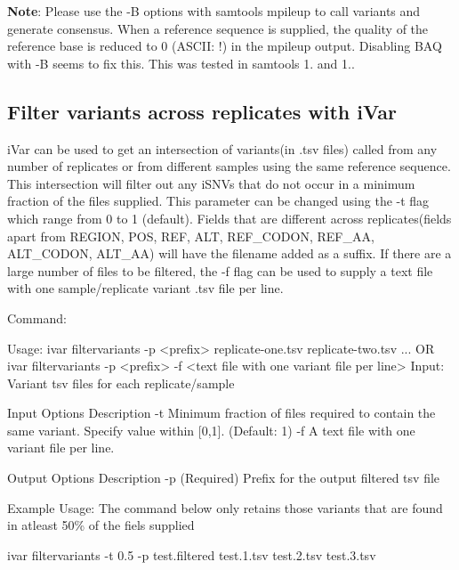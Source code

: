 {\bfseries Note}\+: Please use the -\/B options with {\ttfamily samtools mpileup} to call variants and generate consensus. When a reference sequence is supplied, the quality of the reference base is reduced to 0 (A\+S\+C\+II\+: !) in the mpileup output. Disabling B\+AQ with -\/B seems to fix this. This was tested in samtools 1. and 1..\hypertarget{manualpage_autotoc_md18}{}\subsection{Filter variants across replicates with i\+Var}\label{manualpage_autotoc_md18}
i\+Var can be used to get an intersection of variants(in .tsv files) called from any number of replicates or from different samples using the same reference sequence. This intersection will filter out any i\+S\+N\+Vs that do not occur in a minimum fraction of the files supplied. This parameter can be changed using the {\ttfamily -\/t} flag which range from 0 to 1 (default). Fields that are different across replicates(fields apart from R\+E\+G\+I\+O\+N, P\+O\+S, R\+E\+F, A\+L\+T, R\+E\+F\+\_\+\+C\+O\+D\+O\+N, R\+E\+F\+\_\+\+A\+A, A\+L\+T\+\_\+\+C\+O\+D\+O\+N, A\+L\+T\+\_\+\+A\+A) will have the filename added as a suffix. If there are a large number of files to be filtered, the {\ttfamily -\/f} flag can be used to supply a text file with one sample/replicate variant .tsv file per line.

Command\+:


\begin{DoxyCode}
Usage: ivar filtervariants -p <prefix> replicate-one.tsv replicate-two.tsv ... OR ivar filtervariants -p
       <prefix> -f <text file with one variant file per line>
Input: Variant tsv files for each replicate/sample

Input Options    Description
           -t    Minimum fraction of files required to contain the same variant. Specify value within
       [0,1]. (Default: 1)
           -f    A text file with one variant file per line.

Output Options   Description
           -p    (Required) Prefix for the output filtered tsv file
\end{DoxyCode}


Example Usage\+: The command below only retains those variants that are found in atleast 50\% of the fiels supplied


\begin{DoxyCode}
ivar filtervariants -t 0.5 -p test.filtered test.1.tsv test.2.tsv test.3.tsv
\end{DoxyCode}


